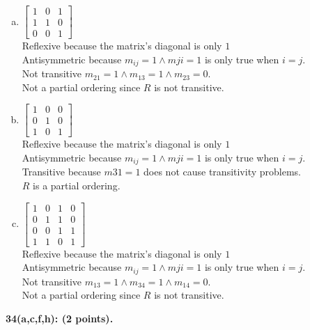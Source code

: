 \documentclass[12pt]{article}  %
\begin{document}
\begin{enumerate}[a)]
    \item $\begin{bmatrix}
    1 & 0 & 1 \\
    1 & 1 & 0 \\
    0 & 0 & 1
    \end{bmatrix}$\\
    Reflexive because the matrix's diagonal is only $1$\\
    Antisymmetric because $m_{ij}=1\land m{ji}=1$ is only true when $i=j$.\\
    Not transitive $m_{21}=1\land m_{13}=1\land m_{23}=0$.\\
    Not a partial ordering since $R$ is not transitive.
    
    \item $\begin{bmatrix}
    1 & 0 & 0 \\
    0 & 1 & 0 \\
    1 & 0 & 1
    \end{bmatrix}$\\
    Reflexive because the matrix's diagonal is only $1$\\
    Antisymmetric because $m_{ij}=1\land m{ji}=1$ is only true when $i=j$.\\
    Transitive because $m{31}=1$ does not cause transitivity problems.\\
    $R$ is a partial ordering.
    
    \item $\begin{bmatrix}
    1 & 0 & 1 & 0 \\
    0 & 1 & 1 & 0 \\
    0 & 0 & 1 & 1 \\
    1 & 1 & 0 & 1
    \end{bmatrix}$\\
    Reflexive because the matrix's diagonal is only $1$\\
    Antisymmetric because $m_{ij}=1\land m{ji}=1$ is only true when $i=j$.\\
    Not transitive $m_{13}=1\land m_{34}=1\land m_{14}=0$.\\
    Not a partial ordering since $R$ is not transitive.
\end{enumerate}

\clearpage
\noindent
{\bf 34(a,c,f,h): (2 points).}
\end{document}
